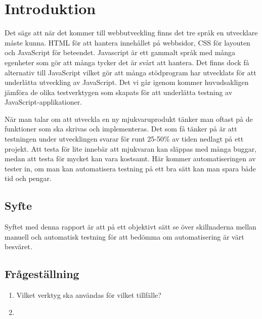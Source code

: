 \section{Introduktion}
\label{sec:david-introduction}
Det sägs att när det kommer till webbutveckling finns det tre språk en utvecklare måste kunna. HTML för att hantera innehållet på webbsidor, CSS för layouten och JavaScript för beteendet. Javascript är ett gammalt språk med många egenheter som gör att många tycker det är svårt att hantera. Det finns dock få alternativ till JavaScript vilket gör att många stödprogram har utvecklats för att underlätta utveckling av JavaScript. Det vi går igenom kommer huvudsakligen jämföra de olika testverktygen som skapats för att underlätta testning av JavaScript-applikationer. 


När man talar om att utveckla en ny mjukvaruprodukt tänker man oftast på de funktioner som ska skrivas och implementeras. Det som få tänker på är att testningen under utvecklingen svarar för runt 25-50\% av tiden nedlagt på ett projekt. Att testa för lite innebär att mjukvaran kan släppas med många buggar, medan att testa för mycket kan vara kostsamt. Här kommer automatiseringen av tester in, om man kan automatisera testning på ett bra sätt kan man spara både tid och pengar.

\subsection{Syfte}
Syftet med denna rapport är att på ett objektivt sätt se över skillnaderna mellan manuell och automatisk testning för att bedömma om automatisering är värt besväret. 

\subsection{Frågeställning}
\label{subsec:david-research-questions}


\begin{enumerate}
\item Vilket verktyg ska användas för vilket tillfälle?
\item 

\end{enumerate}






